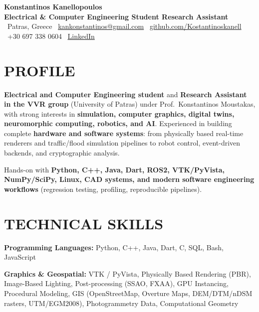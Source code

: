 \documentclass[10pt, a4paper]{article}
\begin{document}
\pagestyle{empty}

\begin{center}
{\fontsize{24pt}{24pt}\selectfont\textbf{Konstantinos Kanellopoulos}}\\[0.4em]
{\large\textcolor{primary}{\textbf{Electrical \& Computer Engineering Student \textbar{} Research Assistant}}}\\[0.7em]
{\small
\faMapMarker \ Patras, Greece \hspace{1em}
\faEnvelope \ \href{mailto:kankonstantinos@gmail.com}{kankonstantinos@gmail.com} \hspace{1em}
\faGithub \ \href{https://github.com/Kostantinoskanell}{github.com/Kostantinoskanell} \hspace{1em}
\faPhone \ +30 697 338 0604 \hspace{1em}
\faLinkedin \ \href{https://www.linkedin.com/in/konstantinos-kanellopoulos-b13a7319a/}{LinkedIn}
}
\end{center}

\vspace{0.6em}

\section*{PROFILE}

\textbf{Electrical and Computer Engineering student} and \textbf{Research Assistant in the VVR group} (University of Patras) under Prof.\ Konstantinos Moustakas, with strong interests in
\textbf{simulation, computer graphics, digital twins, neuromorphic computing, robotics, and AI}. Experienced in building complete \textbf{hardware and software systems}: from physically based real-time renderers and traffic/flood simulation pipelines to robot control, event-driven backends, and cryptographic analysis.

Hands-on with \textbf{Python, C++, Java, Dart, ROS2, VTK/PyVista, NumPy/SciPy, Linux, CAD systems, and modern software engineering workflows} (regression testing, profiling, reproducible pipelines).

\section*{TECHNICAL SKILLS}

\noindent
\textbf{Programming Languages:}
Python, C++, Java, Dart, C, SQL, Bash, JavaScript

\vspace{0.1em}\noindent
\textbf{Graphics \& Geospatial:}
VTK / PyVista, Physically Based Rendering (PBR), Image-Based Lighting, Post-processing (SSAO, FXAA), GPU Instancing, Procedural Modeling, GIS (OpenStreetMap, Overture Maps, DEM/DTM/nDSM rasters, UTM/EGM2008), Photogrammetry Data, Computational Geometry
\end{document}
